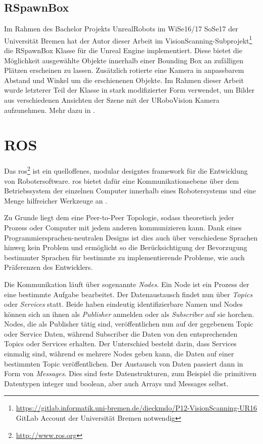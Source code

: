 \subsection{RSpawnBox}
\label{sec:rspawnbox}

Im Rahmen des Bachelor Projekts UnrealRobots im WiSe16/17 SoSe17 der Universität Bremen hat der Autor dieser Arbeit im VisionScanning-Subprojekt\footnote{\url{https://gitlab.informatik.uni-bremen.de/dieckmdo/P12-VisionScanning-UR16} GitLab Account der Universität Bremen notwendig} die RSpawnBox Klasse für die Unreal Engine implementiert. Diese bietet die Möglichkeit ausgewählte Objekte innerhalb einer Bounding Box an zufälligen Plätzen erscheinen zu lassen. Zusätzlich rotierte eine Kamera in anpassbarem Abstand und Winkel um die erschienenen Objekte. Im Rahmen dieser Arbeit wurde letzterer Teil der Klasse in stark modifizierter Form verwendet, um Bilder aus verschiedenen Ansichten der Szene mit der URoboVision Kamera aufzunehmen. Mehr dazu in .         

\section{ROS}
\label{sec:ros}
Das \gls{ros}\footnote{\url{http://www.ros.org}} ist ein quelloffenes, modular designtes \gls{framework} für die Entwicklung von Robotersoftware. \gls{ros} bietet dafür eine Kommunikationsebene über dem Betriebssystem der einzelnen Computer innerhalb eines Robotersystems und eine Menge hilfreicher Werkzeuge an \cite{ros}.\par 

Zu Grunde liegt dem eine Peer-to-Peer Topologie, sodass theoretisch jeder Prozess oder Computer mit jedem anderen kommunizieren kann. Dank eines Programmiersprachen-neutralen Designs ist dies auch über verschiedene Sprachen hinweg kein Problem und ermöglicht so die Berücksichtigung der Bevorzugung bestimmter Sprachen für bestimmte zu implementierende Probleme, wie auch Präferenzen des Entwicklers.\par

Die Kommunikation läuft über sogenannte \textit{Nodes}. Ein Node ist ein Prozess der eine bestimmte Aufgabe bearbeitet. Der Datenaustausch findet nun über \textit{Topics} oder \textit{Services} statt. Beide haben eindeutig identifizierbare Namen und Nodes können sich an ihnen als \textit{Publisher} anmelden oder als \textit{Subscriber} auf sie horchen. Nodes, die als Publisher tätig sind, veröffentlichen nun auf der gegebenem Topic oder Service Daten, während Subscriber die Daten von den entsprechenden Topics oder Services erhalten. Der Unterschied besteht darin, dass Services einmalig sind, während es mehrere Nodes geben kann, die Daten auf einer bestimmten Topic veröffentlichen. Der Austausch von Daten passiert dann in Form von \textit{Messages}. Dies sind feste Datenstrukturen, zum Beispiel die primitiven Datentypen integer und boolean, aber auch Arrays und Messages selbst. \par


